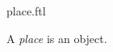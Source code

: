 \documentclass{stex}
\begin{document}
\begin{smodule}{place.ftl}



\begin{signature*}[forthel,for=place]
  A \emph{place} is an object.
\end{signature*}

\end{smodule}
\end{document}
